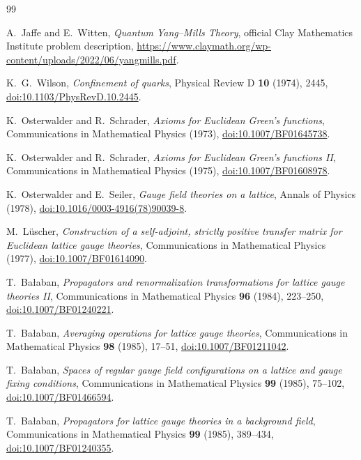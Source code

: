\documentclass[11pt]{article}
\theoremstyle{definition}
\begin{document}
\begin{thebibliography}{99}
\raggedright
\small

A.~Jaffe and E.~Witten,
\emph{Quantum Yang--Mills Theory},
official Clay Mathematics Institute problem description,
\url{https://www.claymath.org/wp-content/uploads/2022/06/yangmills.pdf}.

K.~G.~Wilson,
\emph{Confinement of quarks},
Physical Review D \textbf{10} (1974), 2445,
\href{https://doi.org/10.1103/PhysRevD.10.2445}
{doi:10.1103/PhysRevD.10.2445}.

K.~Osterwalder and R.~Schrader,
\emph{Axioms for Euclidean Green's functions},
Communications in Mathematical Physics (1973),
\href{https://doi.org/10.1007/BF01645738}{doi:10.1007/BF01645738}.

K.~Osterwalder and R.~Schrader,
\emph{Axioms for Euclidean Green's functions II},
Communications in Mathematical Physics (1975),
\href{https://doi.org/10.1007/BF01608978}{doi:10.1007/BF01608978}.

K.~Osterwalder and E.~Seiler,
\emph{Gauge field theories on a lattice},
Annals of Physics (1978),
\href{https://doi.org/10.1016/0003-4916(78)90039-8}
{doi:10.1016/0003-4916(78)90039-8}.

M.~L\"uscher,
\emph{Construction of a self-adjoint, strictly positive transfer matrix
for Euclidean lattice gauge theories},
Communications in Mathematical Physics (1977),
\href{https://doi.org/10.1007/BF01614090}{doi:10.1007/BF01614090}.

T.~Ba{\l}aban,
\emph{Propagators and renormalization transformations for lattice gauge
theories II},
Communications in Mathematical Physics \textbf{96} (1984), 223--250,
\href{https://doi.org/10.1007/BF01240221}{doi:10.1007/BF01240221}.

T.~Ba{\l}aban,
\emph{Averaging operations for lattice gauge theories},
Communications in Mathematical Physics \textbf{98} (1985), 17--51,
\href{https://doi.org/10.1007/BF01211042}{doi:10.1007/BF01211042}.

T.~Ba{\l}aban,
\emph{Spaces of regular gauge field configurations on a lattice and gauge
fixing conditions},
Communications in Mathematical Physics \textbf{99} (1985), 75--102,
\href{https://doi.org/10.1007/BF01466594}{doi:10.1007/BF01466594}.

T.~Ba{\l}aban,
\emph{Propagators for lattice gauge theories in a background field},
Communications in Mathematical Physics \textbf{99} (1985), 389--434,
\href{https://doi.org/10.1007/BF01240355}{doi:10.1007/BF01240355}.


\end{thebibliography}
\end{document}
